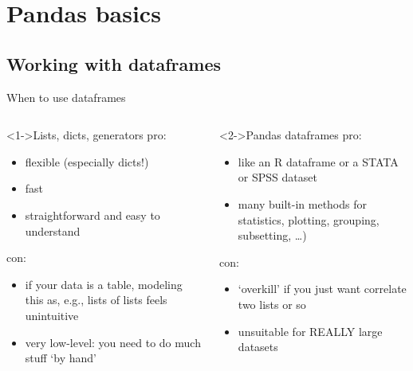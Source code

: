 \documentclass[compress]{beamer}
\begin{document}
\section{Pandas basics}
\subsection{Working with dataframes}





\begin{frame}{When to use dataframes}
	\footnotesize
	\begin{columns}[t]
		
		\begin{block}<1->{Lists, dicts, generators}
		pro:
		\begin{itemize}
			\item flexible (especially dicts!)
			\item fast
			\item straightforward and easy to understand
		\end{itemize}
		con:
		\begin{itemize}
			\item if your data is a table, modeling this as, e.g., lists of lists feels unintuitive
			\item very low-level: you need to do much stuff `by hand'
		\end{itemize}
		
		\end{block}
		
		
		\begin{block}<2->{Pandas dataframes}
			pro:
			\begin{itemize}
				\item like an R dataframe or a STATA or SPSS dataset
				\item many built-in methods for statistics, plotting, grouping, subsetting, \ldots)
			\end{itemize}
			con:
			\begin{itemize}
				\item `overkill' if you just want correlate two lists or so
				\item unsuitable for REALLY large datasets
			\end{itemize}
			
		\end{block}
		
	\end{columns}
	
\end{frame}
\end{document}
